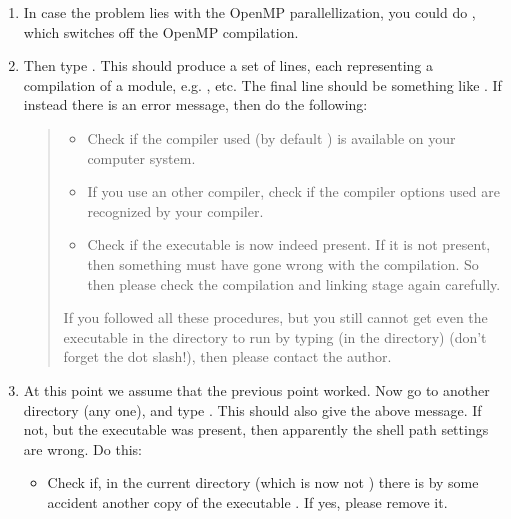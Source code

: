 \documentclass[letterpaper,10pt,english]{sphinxmanual}
\begin{document}
\begin{enumerate}
\item {} 
In case the problem lies with the OpenMP parallellization, you
could do , which switches
off the OpenMP compilation.

\item {} 
Then type . This should produce a set of lines, each
representing a compilation of a module, e.g. , etc. The final line should be
something like . If instead there
is an error message, then do the following:
\begin{quote}
\begin{itemize}
\item {} 
Check if the compiler used (by default ) is
available on your computer system.

\item {} 
If you use an other compiler, check if the compiler options used
are recognized by your compiler.

\item {} 
Check if the executable  is now indeed present.
If it is not present, then something must have gone wrong with the
compilation. So then please check the compilation and linking stage
again carefully.

\end{itemize}

If you followed all these procedures, but you still cannot get even the
executable in the  directory to run by typing (in the
 directory)  (don’t forget the dot
slash!), then please contact the author.
\end{quote}

\item {} 
At this point we assume that the previous point worked. Now go to
another directory (any one), and type .  This should
also give the above message. If not, but the  executable
was present, then apparently the shell path settings are wrong. Do this:
\begin{itemize}
\item {} 
Check if, in the current directory (which is now not )
there is by some accident another copy of the executable
. If yes, please remove it.


\end{itemize}
\end{enumerate}
\end{document}
